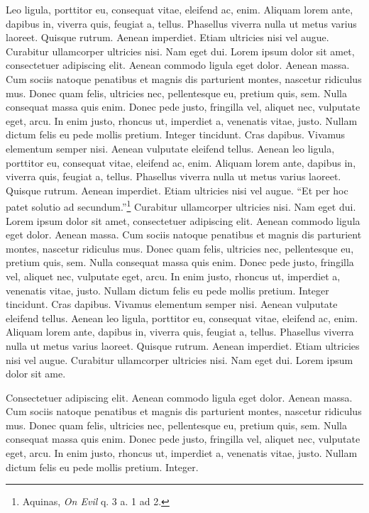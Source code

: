 \documentclass[
    12pt,
    letterpaper,
    oneside,
    noraggedright
]{turabian-researchpaper}
\begin{document}
Leo ligula, porttitor eu, consequat vitae, eleifend ac, enim. Aliquam
lorem ante, dapibus in, viverra quis, feugiat a, tellus. Phasellus
viverra nulla ut metus varius laoreet. Quisque rutrum. Aenean imperdiet.
Etiam ultricies nisi vel augue. Curabitur ullamcorper ultricies nisi.
Nam eget dui. Lorem ipsum dolor sit amet, consectetuer adipiscing elit.
Aenean commodo ligula eget dolor. Aenean massa. Cum sociis natoque
penatibus et magnis dis parturient montes, nascetur ridiculus mus. Donec
quam felis, ultricies nec, pellentesque eu, pretium quis, sem. Nulla
consequat massa quis enim. Donec pede justo, fringilla vel, aliquet nec,
vulputate eget, arcu. In enim justo, rhoncus ut, imperdiet a, venenatis
vitae, justo. Nullam dictum felis eu pede mollis pretium. Integer
tincidunt. Cras dapibus. Vivamus elementum semper nisi. Aenean vulputate
eleifend tellus. Aenean leo ligula, porttitor eu, consequat vitae,
eleifend ac, enim. Aliquam lorem ante, dapibus in, viverra quis, feugiat
a, tellus. Phasellus viverra nulla ut metus varius laoreet. Quisque
rutrum. Aenean imperdiet. Etiam ultricies nisi vel augue. ``Et per hoc
patet solutio ad secundum.''\footnote{Aquinas, \emph{On Evil} q. 3 a. 1
  ad 2.} Curabitur ullamcorper ultricies nisi. Nam eget dui. Lorem ipsum
dolor sit amet, consectetuer adipiscing elit. Aenean commodo ligula eget
dolor. Aenean massa. Cum sociis natoque penatibus et magnis dis
parturient montes, nascetur ridiculus mus. Donec quam felis, ultricies
nec, pellentesque eu, pretium quis, sem. Nulla consequat massa quis
enim. Donec pede justo, fringilla vel, aliquet nec, vulputate eget,
arcu. In enim justo, rhoncus ut, imperdiet a, venenatis vitae, justo.
Nullam dictum felis eu pede mollis pretium. Integer tincidunt. Cras
dapibus. Vivamus elementum semper nisi. Aenean vulputate eleifend
tellus. Aenean leo ligula, porttitor eu, consequat vitae, eleifend ac,
enim. Aliquam lorem ante, dapibus in, viverra quis, feugiat a, tellus.
Phasellus viverra nulla ut metus varius laoreet. Quisque rutrum. Aenean
imperdiet. Etiam ultricies nisi vel augue. Curabitur ullamcorper
ultricies nisi. Nam eget dui. Lorem ipsum dolor sit ame.

Consectetuer adipiscing elit. Aenean commodo ligula eget dolor. Aenean
massa. Cum sociis natoque penatibus et magnis dis parturient montes,
nascetur ridiculus mus. Donec quam felis, ultricies nec, pellentesque
eu, pretium quis, sem. Nulla consequat massa quis enim. Donec pede
justo, fringilla vel, aliquet nec, vulputate eget, arcu. In enim justo,
rhoncus ut, imperdiet a, venenatis vitae, justo. Nullam dictum felis eu
pede mollis pretium. Integer.
\end{document}

